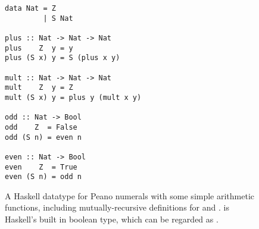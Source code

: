 \begin{figure}
  \begin{haskell}\begin{verbatim}
data Nat = Z
         | S Nat

plus :: Nat -> Nat -> Nat
plus    Z  y = y
plus (S x) y = S (plus x y)

mult :: Nat -> Nat -> Nat
mult    Z  y = Z
mult (S x) y = plus y (mult x y)

odd :: Nat -> Bool
odd    Z  = False
odd (S n) = even n

even :: Nat -> Bool
even    Z  = True
even (S n) = odd n\end{verbatim}
  \end{haskell}
  \caption{A Haskell datatype for Peano numerals with some simple arithmetic functions, including mutually-recursive definitions for  and .  is Haskell's built in boolean type, which can be regarded as .}
  \label{fig:haskellexample}
\end{figure}

